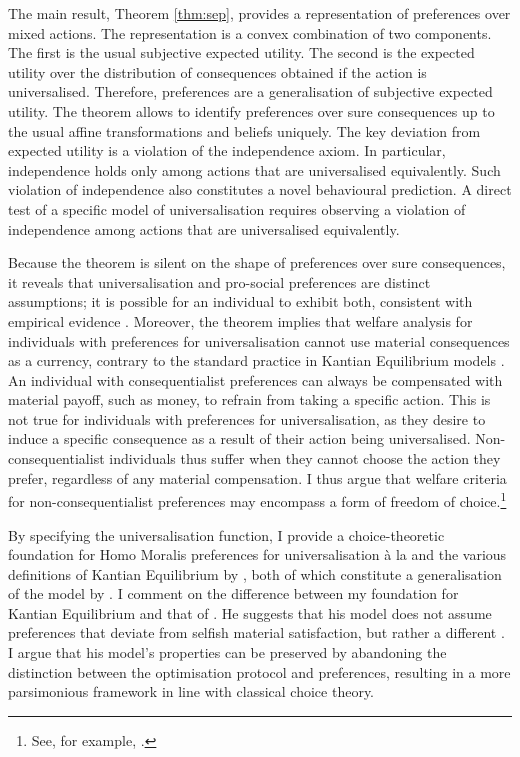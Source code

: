 The main result, Theorem \ref{thm:sep}, provides a representation of preferences over mixed actions. The representation is a convex combination of two components. The first is the usual subjective expected utility. The second is the expected utility over the distribution of consequences obtained if the action is universalised. Therefore, preferences are a generalisation of subjective expected utility. The theorem allows to identify preferences over sure consequences up to the usual affine transformations and beliefs uniquely. The key deviation from expected utility is a violation of the independence axiom. In particular, independence holds only among actions that are universalised equivalently. Such violation of independence also constitutes a novel behavioural prediction. A direct test of a specific model of universalisation requires observing a violation of independence among actions that are universalised equivalently.

Because the theorem is silent on the shape of preferences over sure consequences, it reveals that universalisation and pro-social preferences are distinct assumptions; it is possible for an individual to exhibit both, consistent with empirical evidence \citep{vanleeuwenEstimatingSocialPreferences2024}. Moreover, the theorem implies that welfare analysis for individuals with preferences for universalisation cannot use material consequences as a currency, contrary to the standard practice in Kantian Equilibrium models \citep{roemer2019we}. An individual with consequentialist preferences can always be compensated with material payoff, such as money, to refrain from taking a specific action. This is not true for individuals with preferences for universalisation, as they desire to induce a specific consequence as a result of their action being universalised. Non-consequentialist individuals thus suffer when they cannot choose the action they prefer, regardless of any material compensation. I thus argue that welfare criteria for non-consequentialist preferences may encompass a form of freedom of choice.\footnote{See, for example, \citet[Ch. 10]{fleurbaeyFairnessResponsibilityWelfare2008}.}

By specifying the universalisation function, I provide a choice-theoretic foundation for Homo Moralis preferences for universalisation à la \cite{algerHomoMoralisPreference2013} and the various definitions of Kantian Equilibrium by \cite{roemer2019we}, both of which constitute a generalisation of the model by \cite{laffontMacroeconomicConstraintsEconomic1975}. I comment on the difference between my foundation for Kantian Equilibrium and that of \citeauthor{roemer2019we}. He suggests that his model does not assume preferences that deviate from selfish material satisfaction, but rather a different . I argue that his model's properties can be preserved by abandoning the distinction between the optimisation protocol and preferences, resulting in a more parsimonious framework in line with classical choice theory.

